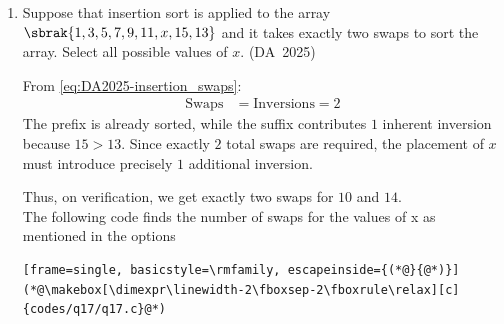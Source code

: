 \begin{enumerate}[label=\thesubsection.\arabic*, ref=\thesubsection.\theenumi]
\item 
Suppose that insertion sort is applied to the array $\sbrak{1, 3, 5, 7, 9, 11, x, 15, 13}$ and it takes exactly two swaps to sort the array. Select all possible values of $x$.
\hfill (DA~2025)
\begin{enumerate}
	\begin{multicols}{4}
		\item $10$
		\item $12$
		\item $14$
		\item $16$
	\end{multicols}
\end{enumerate}
\solution
From \eqref{eq:DA2025-insertion_swaps}:
\begin{align}
	\text{Swaps} &= \text{Inversions} = 2
\end{align}
The prefix  is already sorted, while the suffix  contributes $1$ inherent inversion because $15 > 13$. Since exactly $2$ total swaps are required, the placement of $x$ must introduce precisely $1$ additional inversion. 

Thus, on verification, we get exactly two swaps for $10$ and $14$.
\\
		The following code finds the number of swaps for the values of x as mentioned in the options
\begin{lstlisting}[frame=single, basicstyle=\rmfamily, escapeinside={(*@}{@*)}]
(*@\makebox[\dimexpr\linewidth-2\fboxsep-2\fboxrule\relax][c]{codes/q17/q17.c}@*)
\end{lstlisting}
	

\end{enumerate}
